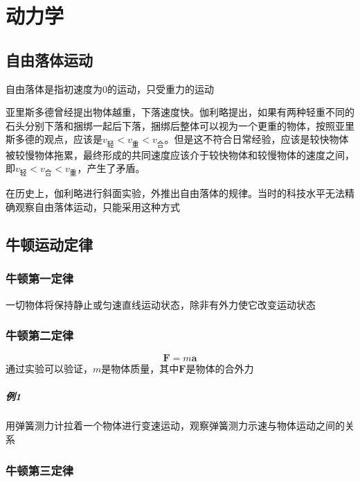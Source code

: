 \chapter{动力学}
\section{自由落体运动}
\begin{definition}
自由落体是指初速度为0的运动，只受重力的运动
\end{definition}

亚里斯多德曾经提出物体越重，下落速度快。伽利略提出，如果有两种轻重不同的石头分别下落和捆绑一起后下落，捆绑后整体可以视为一个更重的物体，按照亚里斯多德的观点，应该是$v_{\text{轻}}<v_{\text{重}}<v_{\text{合}}$。但是这不符合日常经验，应该是较快物体被较慢物体拖累，最终形成的共同速度应该介于较快物体和较慢物体的速度之间，即$v_{\text{轻}}<v_{\text{合}}<v_{\text{重}}$，产生了矛盾。

\begin{tabbing}





\end{tabbing}
在历史上，伽利略进行斜面实验，外推出自由落体的规律。当时的科技水平无法精确观察自由落体运动，只能采用这种方式


\section{牛顿运动定律}
\subsection{牛顿第一定律}
一切物体将保持静止或匀速直线运动状态，除非有外力使它改变运动状态

\subsection{牛顿第二定律}
\begin{equation}\label{newtown2}
\bm{F}=m\bm{a}
\end{equation}
通过实验可以验证，$m$是物体质量，其中$\bm{F}$是物体的合外力 \\
\paragraph{例1}
用弹簧测力计拉着一个物体进行变速运动，观察弹簧测力示速与物体运动之间的关系

\subsection{牛顿第三定律}

